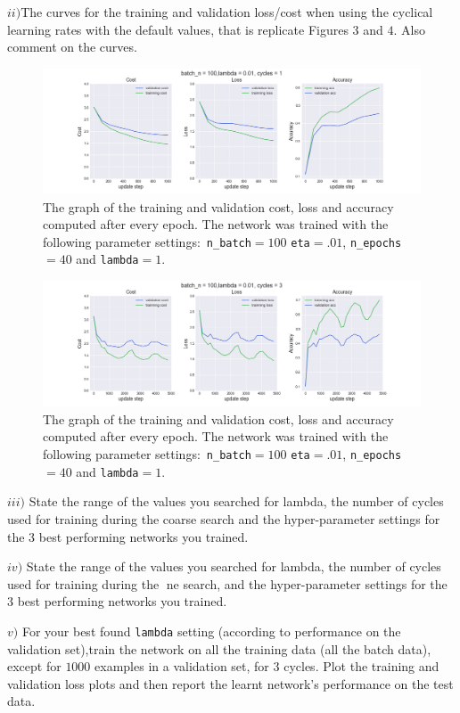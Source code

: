 \documentclass[11pt]{article}
\begin{document}
\begin{tcolorbox}
$ii)$The curves for the training and validation loss/cost when using the cyclical learning rates with the default values, that is replicate Figures $3$ and $4$. Also comment on the curves.
\end{tcolorbox}
\begin{figure}[H]
	\centerline{\includegraphics[width=180mm,scale=0.7]{test2.png}}
	\caption{The graph of the training and validation cost, loss and accuracy computed after every epoch. The network was trained with the following parameter settings$:$ \texttt{n\_batch}$=100$ \texttt{eta}$=.01$, \texttt{n\_epochs}$=40$ and  \texttt{lambda}$=1$.}
	\label{fig:2}
\end{figure}
\begin{figure}[H]
	\centerline{\includegraphics[width=180mm,scale=0.7]{test3.png}}
	\caption{The graph of the training and validation cost, loss and accuracy computed after every epoch. The network was trained with the following parameter settings$:$ \texttt{n\_batch}$=100$ \texttt{eta}$=.01$, \texttt{n\_epochs}$=40$ and  \texttt{lambda}$=1$.}
	\label{fig:3}
\end{figure}
\begin{tcolorbox}
$iii)$ State the range of the values you searched for lambda, the number of cycles used for training during the coarse search and the hyper-parameter settings for the 3 best performing networks you
trained.
\end{tcolorbox}

\begin{tcolorbox}
$iv)$ State the range of the values you searched for lambda, the number of cycles used for training during the ne search, and the hyper-parameter settings for the 3 best performing networks you trained.
\end{tcolorbox}
\begin{tcolorbox}
$v)$ For your best found  \texttt{lambda} setting (according to performance on the validation set),train the network on all the training data (all the batch data), except for $1000$ examples in a validation set, for $3$ cycles. Plot the training and validation loss plots and then report the learnt network's performance on the test data.
\end{tcolorbox}
\end{document}
